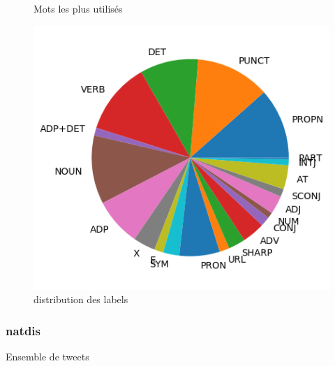 \begin{figure}[H]
\begin{minipage}{0.48\textwidth}
\begin{tabular}{|l || *{11 }{|c} |}
\end{tabular}
\caption{ Mots les plus utilisés } \label{Fig:muw}\end{minipage} 
\begin{minipage}{0.48\textwidth} \centering
\includegraphics[width=.7\linewidth]{foottest_img.png}
\caption{distribution des labels}
\end{minipage}
\end{figure}


\subsubsection{natdis } 
 Ensemble de tweets

